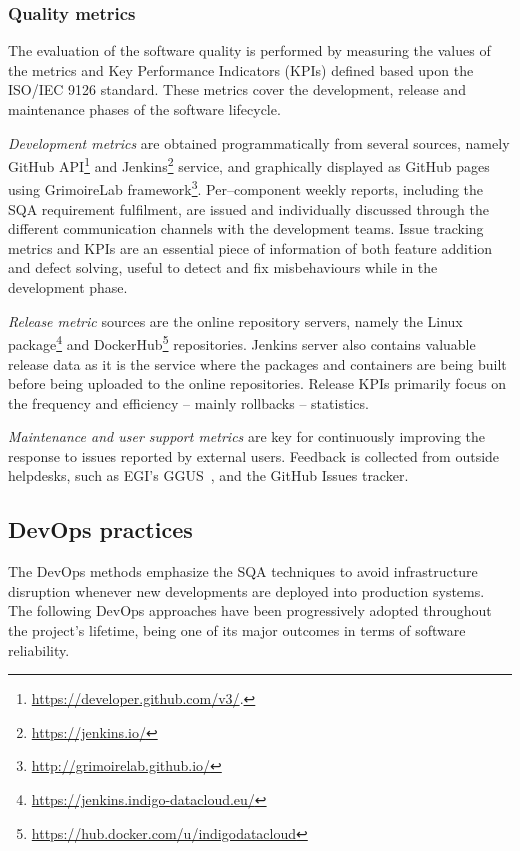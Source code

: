 \documentclass[journal]{IEEEtran}
\begin{document}
\subsubsection{Quality metrics}

The evaluation of the software quality is performed by measuring the values of
the metrics and Key Performance Indicators (KPIs) defined based upon the
ISO/IEC 9126 standard. These metrics cover the development, release and
maintenance phases of the software lifecycle.

\textit{Development metrics} are obtained programmatically from several sources, namely GitHub
API\footnote{\url{https://developer.github.com/v3/}.}
and Jenkins\footnote{\url{https://jenkins.io/}} service, and graphically displayed as GitHub
pages using GrimoireLab framework\footnote{\url{http://grimoirelab.github.io/}}.
Per--component weekly reports, including the SQA requirement
fulfilment, are issued and individually discussed through the different communication channels
with the development teams. Issue tracking metrics and KPIs are an essential piece of information
of both feature addition and defect solving, useful to detect and fix misbehaviours while in the
development phase.

\textit{Release metric} sources are the online repository servers, namely the
Linux package\footnote{\url{https://jenkins.indigo-datacloud.eu/}}
and DockerHub\footnote{\url{https://hub.docker.com/u/indigodatacloud}} repositories. Jenkins
server also contains valuable release data as it is the service where the packages
and containers are being built before being uploaded to the online repositories. Release
KPIs primarily focus on the frequency and efficiency -- mainly rollbacks -- statistics.

\textit{Maintenance and user support metrics} are key for continuously improving the response
to issues reported by external users. Feedback is collected from outside helpdesks, such as
EGI's GGUS~\cite{ggus}, and the GitHub Issues tracker.

\subsection{DevOps practices}
\label{sec:devops}
The DevOps methods emphasize the SQA techniques to avoid infrastructure
disruption whenever new developments are deployed into production systems. The
following DevOps approaches have been progressively adopted throughout the project's
lifetime, being one of its major outcomes in terms of software reliability.
\end{document}
